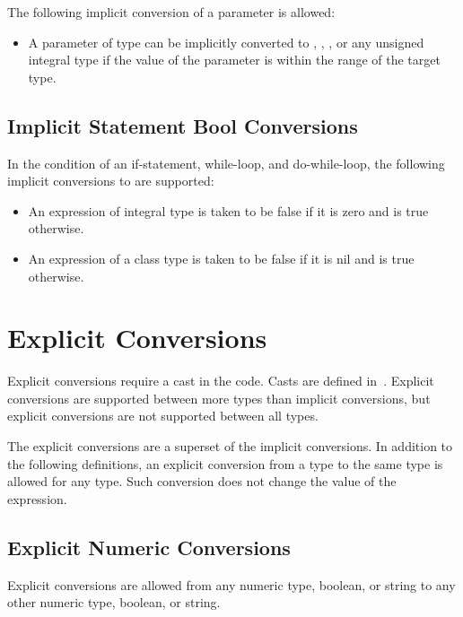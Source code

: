 The following implicit conversion of a parameter is allowed:
\begin{itemize}
\item A parameter of type  can be implicitly converted
to , , , or any unsigned integral type if the
value of the parameter is within the range of the target type.
\end{itemize}

\subsection{Implicit Statement Bool Conversions}
\label{Implicit_Statement_Bool_Conversions}

In the condition of an if-statement, while-loop, and do-while-loop,
the following implicit conversions to  are supported:
\begin{itemize}
\item An expression of integral type is taken to be false if it is zero and is true otherwise.
\item An expression of a class type is taken to be false if it is nil and is true otherwise.
\end{itemize}

\section{Explicit Conversions}
\label{Explicit_Conversions}

Explicit conversions require a cast in the code.  Casts are defined
in~.  Explicit conversions are supported between more
types than implicit conversions, but explicit conversions are not
supported between all types.

The explicit conversions are a superset of the implicit conversions.
In addition to the following definitions,
an explicit conversion from a type to the same type is allowed for any type.
Such conversion does not change the value of the expression.

\subsection{Explicit Numeric Conversions}
\label{Explicit_Numeric_Conversions}

Explicit conversions are allowed from any numeric type, boolean, or
string to any other numeric type, boolean, or string.  

